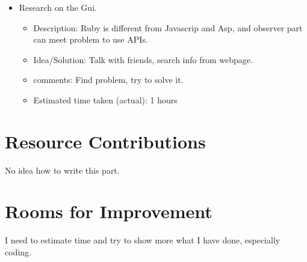 \documentclass{article}
\begin{document}
\begin{itemize}
	\item Research on the Gui. 
	      \begin{itemize}
	         \item Description: Ruby is different from Javascrip and Asp, and observer part can meet problem to use APIs.
	         \item Idea/Solution: Talk with friends, search info from webpage.
	         \item comments: Find problem, try to solve it.
	         \item Estimated time taken (actual): 1 hours
	     \end{itemize}
\end{itemize}

\section*{Resource Contributions}

No idea how to write this part.

\section*{Rooms for Improvement}

I need to estimate time and try to show more what I have done, especially coding.
\end{document}
